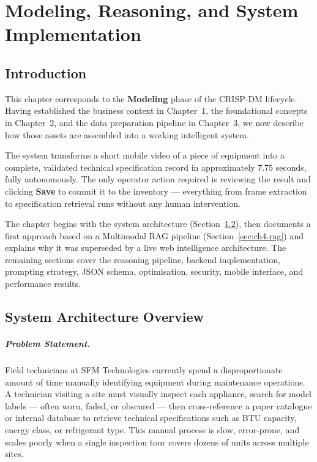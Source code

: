 \chapter{Modeling, Reasoning, and System Implementation}


\section{Introduction}
\label{sec:ch4-intro}

This chapter corresponds to the \textbf{Modeling} phase of the CRISP-DM lifecycle. Having established the business context in Chapter~1, the foundational concepts in Chapter~2, and the data preparation pipeline in Chapter~3, we now describe how those assets are assembled into a working intelligent system.

The system transforms a short mobile video of a piece of equipment into a complete, validated technical specification record in approximately 7.75 seconds, fully autonomously. The only operator action required is reviewing the result and clicking \textbf{Save} to commit it to the inventory — everything from frame extraction to specification retrieval runs without any human intervention.

The chapter begins with the system architecture (Section~\ref{sec:ch4-architecture}), then documents a first approach based on a Multimodal RAG pipeline (Section~\ref{sec:ch4-rag}) and explains why it was superseded by a live web intelligence architecture. The remaining sections cover the reasoning pipeline, backend implementation, prompting strategy, JSON schema, optimisation, security, mobile interface, and performance results.

\section{System Architecture Overview}
\label{sec:ch4-architecture}

\paragraph{Problem Statement.}

Field technicians at SFM Technologies currently spend a disproportionate amount of time manually identifying equipment during maintenance operations. A technician visiting a site must visually inspect each appliance, search for model labels — often worn, faded, or obscured — then cross-reference a paper catalogue or internal database to retrieve technical specifications such as BTU capacity, energy class, or refrigerant type. This manual process is slow, error-prone, and scales poorly when a single inspection tour covers dozens of units across multiple sites.

